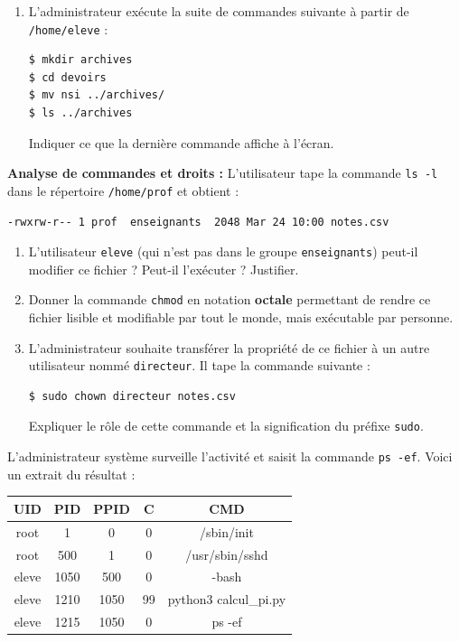 \begin{Exercise}[title={Systèmes d'exploitation, gestion des fichiers et des processus}]
\begin{enumerate}
    \item L'administrateur exécute la suite de commandes suivante à partir de \texttt{/home/eleve} :
\begin{lstlisting}[language=bash]
$ mkdir archives
$ cd devoirs
$ mv nsi ../archives/
$ ls ../archives\end{lstlisting}
Indiquer ce que la dernière commande affiche à l'écran.
\end{enumerate}

\Question \textbf{Analyse de commandes et droits :}
L'utilisateur tape la commande \texttt{ls -l} dans le répertoire \texttt{/home/prof} et obtient :
\begin{lstlisting}
-rwxrw-r-- 1 prof  enseignants  2048 Mar 24 10:00 notes.csv
\end{lstlisting}
\begin{enumerate}
    \item L'utilisateur \texttt{eleve} (qui n'est pas dans le groupe \texttt{enseignants}) peut-il modifier ce fichier ? Peut-il l'exécuter ? Justifier.
    \item Donner la commande \texttt{chmod} en notation \textbf{octale} permettant de rendre ce fichier lisible et modifiable par tout le monde, mais exécutable par personne.
    \item L'administrateur souhaite transférer la propriété de ce fichier à un autre utilisateur nommé \texttt{directeur}. Il tape la commande suivante :
    \begin{lstlisting}[language=bash]
$ sudo chown directeur notes.csv\end{lstlisting}
    Expliquer le rôle de cette commande et la signification du préfixe \texttt{sudo}.
\end{enumerate}


\Question L'administrateur système surveille l'activité et saisit la commande \texttt{ps -ef}. Voici un extrait du résultat :

\begin{center}
\begin{tabular}{|c|c|c|c|c|}
\hline
\textbf{UID} & \textbf{PID} & \textbf{PPID} & \textbf{C} & \textbf{CMD} \\ \hline
root & 1 & 0 & 0 & /sbin/init \\ \hline
root & 500 & 1 & 0 & /usr/sbin/sshd \\ \hline
eleve & 1050 & 500 & 0 & -bash \\ \hline
eleve & 1210 & 1050 & 99 & python3 calcul\_pi.py \\ \hline
eleve & 1215 & 1050 & 0 & ps -ef \\ \hline
\end{tabular}
\end{center}


\end{Exercise}

